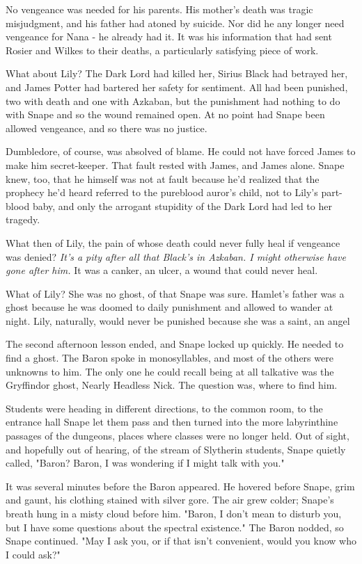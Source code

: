 No vengeance was needed for his parents. His mother's death was tragic misjudgment, and his father had atoned by suicide. Nor did he any longer need vengeance for Nana - he already had it. It was his information that had sent Rosier and Wilkes to their deaths, a particularly satisfying piece of work.

What about Lily? The Dark Lord had killed her, Sirius Black had betrayed her, and James Potter had bartered her safety for sentiment. All had been punished, two with death and one with Azkaban, but the punishment had nothing to do with Snape and so the wound remained open. At no point had Snape been allowed vengeance, and so there was no justice.

Dumbledore, of course, was absolved of blame. He could not have forced James to make him secret-keeper. That fault rested with James, and James alone. Snape knew, too, that he himself was not at fault because he'd realized that the prophecy he'd heard referred to the pureblood auror's child, not to Lily's part-blood baby, and only the arrogant stupidity of the Dark Lord had led to her tragedy.

What then of Lily, the pain of whose death could never fully heal if vengeance was denied? \emph{It's a pity after all that Black's in Azkaban. I might otherwise have gone after him.} It was a canker, an ulcer, a wound that could never heal.

What of Lily? She was no ghost, of that Snape was sure. Hamlet's father was a ghost because he was doomed to daily punishment and allowed to wander at night. Lily, naturally, would never be punished because she was a saint, an angel{\el}

The second afternoon lesson ended, and Snape locked up quickly. He needed to find a ghost. The Baron spoke in monosyllables, and most of the others were unknowns to him. The only one he could recall being at all talkative was the Gryffindor ghost, Nearly Headless Nick. The question was, where to find him.

Students were heading in different directions, to the common room, to the entrance hall{\el} Snape let them pass and then turned into the more labyrinthine passages of the dungeons, places where classes were no longer held. Out of sight, and hopefully out of hearing, of the stream of Slytherin students, Snape quietly called, "Baron? Baron, I was wondering if I might talk with you."

It was several minutes before the Baron appeared. He hovered before Snape, grim and gaunt, his clothing stained with silver gore. The air grew colder; Snape's breath hung in a misty cloud before him. "Baron, I don't mean to disturb you, but I have some questions about the spectral existence." The Baron nodded, so Snape continued. "May I ask you, or if that isn't convenient, would you know who I could ask?"

